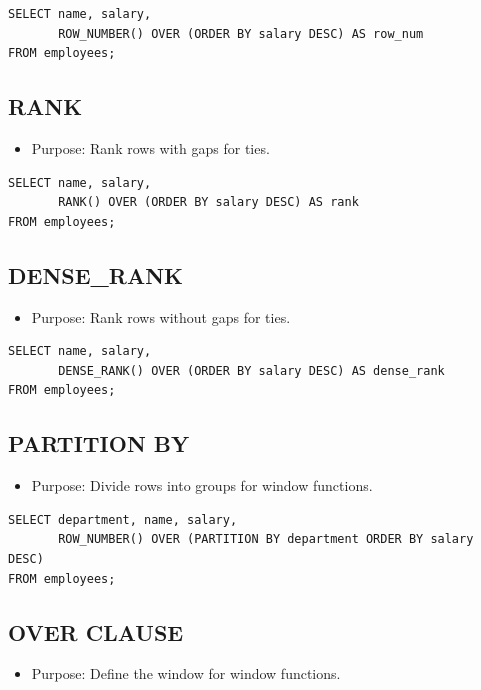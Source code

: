 \documentclass[10pt]{article}
\begin{document}
\begin{verbatim}
SELECT name, salary,
       ROW_NUMBER() OVER (ORDER BY salary DESC) AS row_num
FROM employees;
\end{verbatim}

\subsection{RANK}
\begin{itemize}
    \item Purpose: Rank rows with gaps for ties.
\end{itemize}

\begin{verbatim}
SELECT name, salary,
       RANK() OVER (ORDER BY salary DESC) AS rank
FROM employees;
\end{verbatim}

\subsection{DENSE\_RANK}
\begin{itemize}
    \item Purpose: Rank rows without gaps for ties.
\end{itemize}

\begin{verbatim}
SELECT name, salary,
       DENSE_RANK() OVER (ORDER BY salary DESC) AS dense_rank
FROM employees;
\end{verbatim}

\subsection{PARTITION BY}
\begin{itemize}
    \item Purpose: Divide rows into groups for window functions.
\end{itemize}

\begin{verbatim}
SELECT department, name, salary,
       ROW_NUMBER() OVER (PARTITION BY department ORDER BY salary DESC)
FROM employees;
\end{verbatim}

\subsection{OVER CLAUSE}
\begin{itemize}
    \item Purpose: Define the window for window functions.
\end{itemize}
\end{document}
